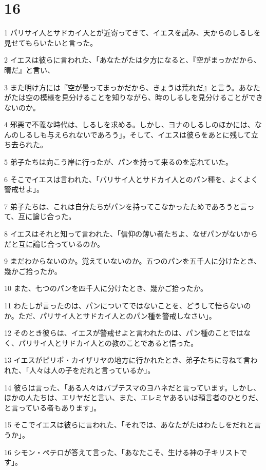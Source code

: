 \chapter{16}

\par 1 パリサイ人とサドカイ人とが近寄ってきて、イエスを試み、天からのしるしを見せてもらいたいと言った。
\par 2 イエスは彼らに言われた、「あなたがたは夕方になると、『空がまっかだから、晴だ』と言い、
\par 3 また明け方には『空が曇ってまっかだから、きょうは荒れだ』と言う。あなたがたは空の模様を見分けることを知りながら、時のしるしを見分けることができないのか。
\par 4 邪悪で不義な時代は、しるしを求める。しかし、ヨナのしるしのほかには、なんのしるしも与えられないであろう」。そして、イエスは彼らをあとに残して立ち去られた。
\par 5 弟子たちは向こう岸に行ったが、パンを持って来るのを忘れていた。
\par 6 そこでイエスは言われた、「パリサイ人とサドカイ人とのパン種を、よくよく警戒せよ」。
\par 7 弟子たちは、これは自分たちがパンを持ってこなかったためであろうと言って、互に論じ合った。
\par 8 イエスはそれと知って言われた、「信仰の薄い者たちよ、なぜパンがないからだと互に論じ合っているのか。
\par 9 まだわからないのか。覚えていないのか。五つのパンを五千人に分けたとき、幾かご拾ったか。
\par 10 また、七つのパンを四千人に分けたとき、幾かご拾ったか。
\par 11 わたしが言ったのは、パンについてではないことを、どうして悟らないのか。ただ、パリサイ人とサドカイ人とのパン種を警戒しなさい」。
\par 12 そのとき彼らは、イエスが警戒せよと言われたのは、パン種のことではなく、パリサイ人とサドカイ人との教のことであると悟った。
\par 13 イエスがピリポ・カイザリヤの地方に行かれたとき、弟子たちに尋ねて言われた、「人々は人の子をだれと言っているか」。
\par 14 彼らは言った、「ある人々はバプテスマのヨハネだと言っています。しかし、ほかの人たちは、エリヤだと言い、また、エレミヤあるいは預言者のひとりだ、と言っている者もあります」。
\par 15 そこでイエスは彼らに言われた、「それでは、あなたがたはわたしをだれと言うか」。
\par 16 シモン・ペテロが答えて言った、「あなたこそ、生ける神の子キリストです」。

